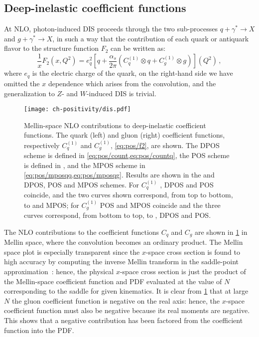 \subsection{Deep-inelastic coefficient functions}
\label{sec:pos/discf}
At NLO, photon-induced DIS proceeds through the two
sub-processes $q+\gamma^*\to X$ and $g+\gamma^*\to X$, in such a way
that the contribution of each quark or antiquark flavor to the
structure function $F_2$ can be written as:
\begin{equation}\label{eq:pos/f2}
 \frac{1}{x} F_2(x,Q^2)= e_q^2 \left[q
 +\frac{\alpha_s}{2\pi}\left( C^{(1)}_q \otimes q+ C^{(1)}_g \otimes
 g\right)\right](Q^2)\,,
 \end{equation}
where $e_q$ is the electric charge of the quark, on the right-hand
side we have omitted the $x$ dependence which arises from the
convolution,
and the
generalization to $Z$- and $W$-induced DIS is trivial.

\begin{figure}[t]
  \begin{center}
    \texttt{[image: ch-positivity/dis.pdf]}
    \caption{\small Mellin-space NLO contributions to deep-inelastic coefficient
      functions. The quark (left) and gluon (right) coefficient
      functions, respectively $C_q^{(1)}$ and $C_g^{(1)}$, \cref{eq:pos/f2}, are
      shown. The DPOS
      scheme is defined in \cref{eq:pos/count,eq:pos/countq}, the POS
      scheme is defined in ,
      and the MPOS scheme
      in \cref{eq:pos/mposqq,eq:pos/mposqg}.
      Results are shown in the \msbar{} and DPOS, POS and MPOS
      schemes. For  $C_q^{(1)}$ \msbar{}, DPOS and POS
      coincide, and the two curves shown correspond, from top to
      bottom, to \msbar{} and MPOS; for $C_g^{(1)}$ POS and MPOS
      coincide and the three
      curves correspond,
      from  bottom to top, to \msbar{}, DPOS and POS.
    \label{fig:pos/dis} }
  \end{center}
\end{figure}
  The
  \msbar{} NLO contributions to the coefficient functions
  $C_q$ and $C_g$ are shown in \cref{fig:pos/dis} in Mellin space,
  where the convolution becomes an ordinary product. The
  Mellin space plot is especially transparent since the $x$-space
  cross section is found to high accuracy by computing the inverse
  Mellin transform in the saddle-point
  approximation~\cite{Bonvini:2012an}: hence, the physical  $x$-space
  cross section is just the product of the Mellin-space coefficient
  function and PDF evaluated at the value of $N$ corresponding to the
  saddle for given kinematics. 
  It is clear  from \cref{fig:pos/dis} that at
  large $N$ the gluon coefficient function is negative on the real
  axis: hence, the $x$-space coefficient function must also be
  negative because its real moments are negative. This shows
 that a negative contribution has been factored from the coefficient
 function into the PDF. 


